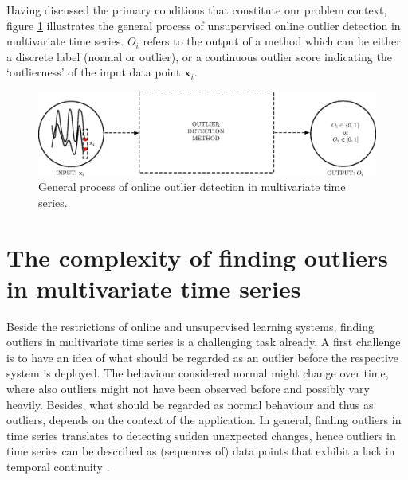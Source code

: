 Having discussed the primary conditions that constitute our problem context, figure \ref{fig:intro_outlierdetection_process} illustrates the general process of unsupervised online outlier detection in multivariate time series. $O_i$ refers to the output of a method which can be either a discrete label (normal or outlier), or a continuous outlier score indicating the `outlierness' of the input data point $\mathbf{x}_i$.

\begin{figure}[h]
	\centering
	\includegraphics[scale=0.72]{introduction/outlierdetection_process}
	\caption{General process of online outlier detection in multivariate time series.}
	\label{fig:intro_outlierdetection_process}	
	\vspace{-0.1cm}
\end{figure}


\section{The complexity of finding outliers in multivariate time series}
\label{sec:introduction_complexity}

Beside the restrictions of online and unsupervised learning systems, finding outliers in multivariate time series is a challenging task already. 
A first challenge is to have an idea of what should be regarded as an outlier before the respective system is deployed. The behaviour considered normal might change over time, where also outliers might not have been observed before and possibly vary heavily. Besides, what should be regarded as normal behaviour and thus as outliers, depends on the context of the application. In general, finding outliers in time series translates to detecting sudden unexpected changes, hence outliers in time series can be described as (sequences of) data points that exhibit a lack in temporal continuity \cite{aggarwal2015outlier}. 

